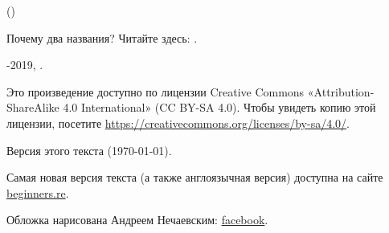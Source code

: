 ﻿\begin{titlepage}


\end{titlepage}

\newpage

\begin{center}
\vspace*{\fill}
{\LARGE \TitleMain}

\bigskip

{\large (\TitleAux)}

\bigskip
\bigskip
Почему два названия? Читайте здесь: .

\vspace*{\fill}

{\large \AUTHOR}

{\large \TT{<\EMAIL>}}
\vspace*{\fill}
\vfill

\ccbysa

-2019, \AUTHOR. 

Это произведение доступно по лицензии Creative Commons «Attribution-ShareAlike 4.0 International» (CC BY-SA 4.0).
Чтобы увидеть копию этой лицензии, посетите \url{https://creativecommons.org/licenses/by-sa/4.0/}.

Версия этого текста ({\large \today}).

Самая новая версия текста (а также англоязычная версия) доступна на сайте \href{http://go.yurichev.com/17009}{beginners.re}.

Обложка нарисована Андреем Нечаевским: \href{http://go.yurichev.com/17023}{facebook}.

\end{center}
